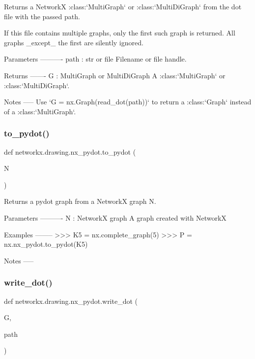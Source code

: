 \begin{DoxyVerb}Returns a NetworkX :class:`MultiGraph` or :class:`MultiDiGraph` from the
dot file with the passed path.

If this file contains multiple graphs, only the first such graph is
returned. All graphs _except_ the first are silently ignored.

Parameters
----------
path : str or file
    Filename or file handle.

Returns
-------
G : MultiGraph or MultiDiGraph
    A :class:`MultiGraph` or :class:`MultiDiGraph`.

Notes
-----
Use `G = nx.Graph(read_dot(path))` to return a :class:`Graph` instead of a
:class:`MultiGraph`.
\end{DoxyVerb}
 \mbox{\label{namespacenetworkx_1_1drawing_1_1nx__pydot_a4241b8bd9ba6c83dda07fed169a1ef6e}} 
\subsubsection{\texorpdfstring{to\+\_\+pydot()}{to\_pydot()}}
{\footnotesize\ttfamily def networkx.\+drawing.\+nx\+\_\+pydot.\+to\+\_\+pydot (\begin{DoxyParamCaption}\item[{}]{N }\end{DoxyParamCaption})}

\begin{DoxyVerb}Returns a pydot graph from a NetworkX graph N.

Parameters
----------
N : NetworkX graph
  A graph created with NetworkX

Examples
--------
>>> K5 = nx.complete_graph(5)
>>> P = nx.nx_pydot.to_pydot(K5)

Notes
-----\end{DoxyVerb}
 \mbox{\label{namespacenetworkx_1_1drawing_1_1nx__pydot_a857e86b9a44cfa838d5a32dfd8afb9fd}} 
\subsubsection{\texorpdfstring{write\+\_\+dot()}{write\_dot()}}
{\footnotesize\ttfamily def networkx.\+drawing.\+nx\+\_\+pydot.\+write\+\_\+dot (\begin{DoxyParamCaption}\item[{}]{G,  }\item[{}]{path }\end{DoxyParamCaption})}

